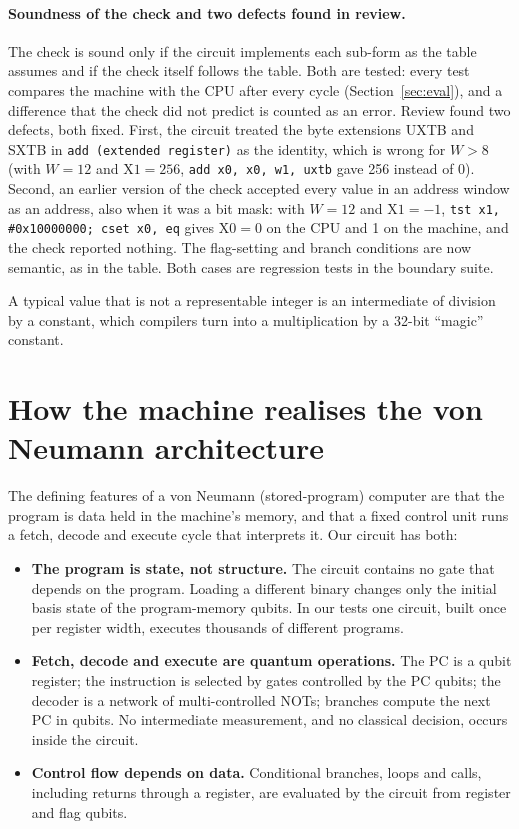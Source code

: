 \documentclass[11pt]{article}
\begin{document}
\paragraph{Soundness of the check and two defects found in review.} The check is sound only if the
circuit implements each sub-form as the table assumes and if the check itself follows the table. Both
are tested: every test compares the machine with the CPU after every cycle (Section~\ref{sec:eval}),
and a difference that the check did not predict is counted as an error. Review found two defects,
both fixed. First, the circuit treated the byte extensions UXTB and SXTB in \texttt{add (extended
register)} as the identity, which is wrong for $W>8$ (with $W=12$ and $\mathrm{X1}=256$,
\texttt{add x0, x0, w1, uxtb} gave 256 instead of 0). Second, an earlier version of the check
accepted every value in an address window as an address, also when it was a bit mask: with $W=12$ and
$\mathrm{X1}=-1$, \texttt{tst x1, \#0x10000000; cset x0, eq} gives $\mathrm{X0}=0$ on the CPU and 1 on the
machine, and the check reported nothing. The flag-setting and branch conditions are now semantic, as in
the table. Both cases are regression tests in the boundary suite.

A typical value that is not a representable integer is an intermediate of division by a constant, which compilers turn
into a multiplication by a 32-bit ``magic'' constant.

\section{How the machine realises the von Neumann architecture}
\label{sec:vonneumann}

The defining features of a von Neumann (stored-program) computer are that the program is
data held in the machine's memory, and that a fixed control unit runs a fetch, decode and
execute cycle that interprets it. Our circuit has both:

\begin{itemize}
  \item \textbf{The program is state, not structure.} The circuit contains no gate that
        depends on the program. Loading a different binary changes only the initial basis
        state of the program-memory qubits. In our tests one circuit, built once per register
        width, executes thousands of different programs.
  \item \textbf{Fetch, decode and execute are quantum operations.} The PC is a qubit
        register; the instruction is selected by gates controlled by the PC qubits; the
        decoder is a network of multi-controlled NOTs; branches compute the next PC in
        qubits. No intermediate measurement, and no classical decision, occurs inside the
        circuit.
  \item \textbf{Control flow depends on data.} Conditional branches, loops and calls,
        including returns through a register, are evaluated by the circuit from register
        and flag qubits.
\end{itemize}
\end{document}
